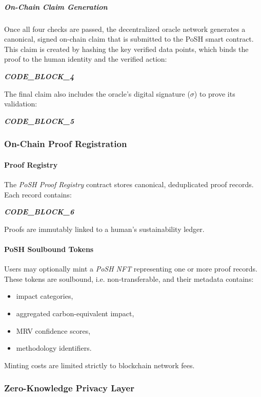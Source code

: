 \documentclass{article}
\begin{document}
\subparagraph{On-Chain Claim Generation}

Once all four checks are passed, the decentralized oracle network generates a canonical, signed on-chain claim that is submitted to the PoSH smart contract. This claim is created by hashing the key verified data points, which binds the proof to the human identity and the verified action:

\textit{\textbf{CODE\_BLOCK\_4}}

The final claim also includes the oracle's digital signature ($\sigma$) to prove its validation:

\textit{\textbf{CODE\_BLOCK\_5}}

\subsubsection{On-Chain Proof Registration}

\paragraph{Proof Registry}

The \textit{PoSH Proof Registry} contract stores canonical, deduplicated proof
records. Each record contains:

\textit{\textbf{CODE\_BLOCK\_6}}

Proofs are immutably linked to a human's sustainability ledger.

\paragraph{PoSH Soulbound Tokens}

Users may optionally mint a \textit{PoSH NFT} representing one or more proof
records. These tokens are soulbound, i.e. non-transferable, and their metadata
contains:

\begin{itemize}
\item impact categories,
\item aggregated carbon-equivalent impact,
\item MRV confidence scores,
\item methodology identifiers.
\end{itemize}

Minting costs are limited strictly to blockchain network fees.

\subsubsection{Zero-Knowledge Privacy Layer}
\end{document}
